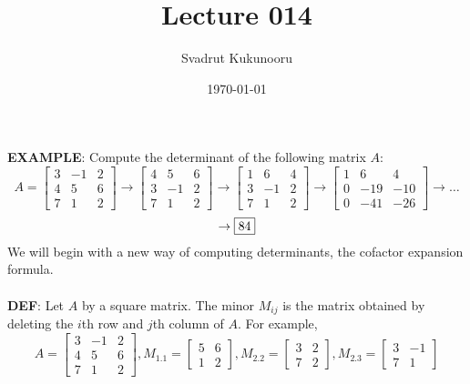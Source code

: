 \documentclass[letterpaper]{report}
\title{Lecture 014}
\author{Svadrut Kukunooru}
\date{\today}
\begin{document}
\begin{titlepage}
    \maketitle
\end{titlepage}
   \textbf{EXAMPLE}: Compute the determinant of the following matrix $A$: 
   \[
   A = 
   \begin{bmatrix} 
       3 & -1 & 2 \\
       4 & 5 & 6 \\
       7 & 1 & 2 
   \end{bmatrix} \to 
   \begin{bmatrix} 
       4 & 5 & 6 \\
       3 & -1 & 2 \\
       7 & 1 & 2 
   \end{bmatrix} \to
   \begin{bmatrix} 
       1 & 6 & 4 \\
       3 & -1 & 2 \\
       7 & 1 & 2
   \end{bmatrix} \to 
   \begin{bmatrix} 
       1 & 6 & 4 \\
       0 & -19 & -10 \\
       0 & -41 & -26
   \end{bmatrix} \to \ldots
   \] 
   \[
       \to \fbox{84}
   \] 
   We will begin with a new way of computing determinants, the cofactor expansion formula.  \\ \\ 
   \textbf{DEF}: Let $A$ by a square matrix. The minor $M_{ij}$ is the matrix obtained by deleting the $i$th row and $j$th column of $A$. For example, 
   \[
   A = 
   \begin{bmatrix} 
       3 & -1 & 2 \\
       4 & 5 & 6 \\
       7 & 1 & 2 
   \end{bmatrix}, 
   M_{1.1} = 
   \begin{bmatrix} 
       5 & 6 \\
       1 & 2
   \end{bmatrix} , 
   M_{2.2} = 
   \begin{bmatrix} 
       3 & 2 \\
       7 & 2 
   \end{bmatrix},
   M_{2.3} = 
   \begin{bmatrix} 
       3 & -1 \\
       7 & 1 
   \end{bmatrix} 
   \] 
\end{document}
